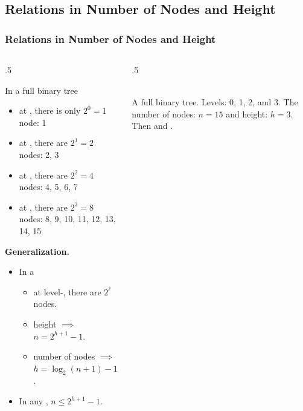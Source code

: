 \documentclass[10pt]{beamer}
\begin{document}
\subsection{Relations in Number of Nodes and Height}
\begin{frame}[t]\frametitle{Relations in Number of Nodes and Height}
	\begin{columns}[T] %
	\begin{column}{.5\linewidth} %
		{\footnotesize
 	    	In a full binary tree
		\begin{itemize}
			
			\item
			at , there is only $2^{0} = 1$ node: 1
			
			\item
			at , there are $2^{1} = 2$ nodes: 2, 3
			
			\item
			at ,  there are $2^{2} = 4$ nodes: 4, 5, 6, 7
						
			\item
			at ,  there are $2^{3} = 8$ nodes: 8, 9, 10, 11, 12, 13, 14, 15
			
		\end{itemize}
		\textbf{Generalization.}
		\begin{itemize}
						
			\item
			In a 
			\begin{itemize}
				
				\item
				at level-\hEmph{$\ell$},  there are $2^{\ell}$nodes.
				
				\item 
				height  $\implies$ $n = 2^{h +1} - 1$.
				
				\item
				number of nodes  $\implies$ 
				$h = \log_{2}(n + 1) - 1$.
				
			\end{itemize}
			
			\item 
			In any , $n \le 2^{h +1} - 1$.
		
		\end{itemize}
		} %

		
	\end{column} %
	\begin{column}{.5\linewidth} %
		\begin{example}
		{\scriptsize
			
			\\
			A full binary tree.
			Levels: 0, 1, 2, and 3.
			The number of nodes: $n = 15$ and
			height: $h = 3$.
			\\
			Then
			 and
			.
			
}
\end{example}
\end{column}
\end{columns}
\end{frame}
\end{document}

